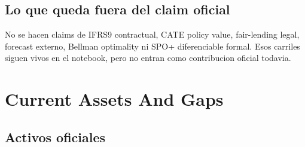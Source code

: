 \documentclass[
  spanish,
  11pt,
  letterpaper,
]{scrbook}
\theoremstyle{plain}
\theoremstyle{remark}
\begin{document}
\section{Lo que queda fuera del claim
oficial}\label{lo-que-queda-fuera-del-claim-oficial}

No se hacen claims de IFRS9 contractual, CATE policy value, fair-lending
legal, forecast externo, Bellman optimality ni SPO+ diferenciable
formal. Esos carriles siguen vivos en el notebook, pero no entran como
contribucion oficial todavia.

\chapter{Current Assets And Gaps}\label{current-assets-and-gaps}

\section{Activos oficiales}\label{activos-oficiales}
\end{document}
